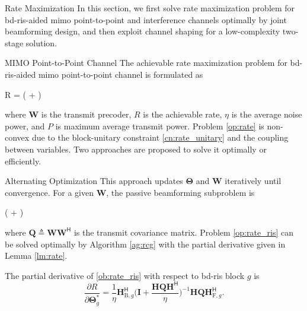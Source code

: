 \documentclass[journal]{IEEEtran}
\begin{document}
	\begin{section}{Rate Maximization}
		\label{sc:rate}
		In this section, we first solve rate maximization problem for \gls{bd}-\gls{ris}-aided \gls{mimo} point-to-point and interference channels optimally by joint beamforming design, and then exploit channel shaping for a low-complexity two-stage solution.

		\begin{subsection}{MIMO Point-to-Point Channel}
			\label{sc:rate_pc}
			The achievable rate maximization problem for \gls{bd}-\gls{ris}-aided \gls{mimo} point-to-point channel is formulated as
			\begin{maxi!}
				{}{R = \log \det \biggl( + \biggr)}{\label{op:rate}}{\label{ob:rate}}
			\end{maxi!}
			where $\mathbf{W}$ is the transmit precoder, $R$ is the achievable rate, $\eta$ is the average noise power, and $P$ is maximum average transmit power.
			Problem \eqref{op:rate} is non-convex due to the block-unitary constraint \eqref{cn:rate_unitary} and the coupling between variables.
			Two approaches are proposed to solve it optimally or efficiently.

			\begin{subsubsection}{Alternating Optimization}
				This approach updates $\mathbf{\Theta}$ and $\mathbf{W}$ iteratively until convergence.
				For a given $\mathbf{W}$, the passive beamforming subproblem is
				\begin{maxi!}
					{\scriptstyle{\mathbf{\Theta}}}{\log \det \biggl( + \biggr)}{\label{op:rate_ris}}{\label{ob:rate_ris}}
					\addConstraint{\mathbf{\Theta}_g^\mathsf{H} \mathbf{\Theta}_g=\mathbf{I}, \quad \forall g,}{}{}
				\end{maxi!}
				where $\mathbf{Q} \triangleq \mathbf{W} \mathbf{W}^\mathsf{H}$ is the transmit covariance matrix.
				Problem \eqref{op:rate_ris} can be solved optimally by Algorithm \ref{ag:rcg} with the partial derivative given in Lemma \ref{lm:rate}.
				\begin{lemma}
					\label{lm:rate}
					The partial derivative of \eqref{ob:rate_ris} with respect to \gls{bd}-\gls{ris} block $g$ is
					\begin{equation}
						\label{eq:gradient_eucl_rate}
						\frac{\partial R}{\partial \mathbf{\Theta}_g^*} = \frac{1}{\eta} \mathbf{H}_{\mathrm{B},g}^\mathsf{H} \biggl(\mathbf{I} + \frac{\mathbf{H}\mathbf{Q}\mathbf{H}^\mathsf{H}}{\eta}\biggr)^{-1} \mathbf{H} \mathbf{Q} \mathbf{H}_{\mathrm{F},g}^\mathsf{H}.
					\end{equation}
				\end{lemma}


\end{subsubsection}
\end{subsection}
\end{section}
\end{document}
